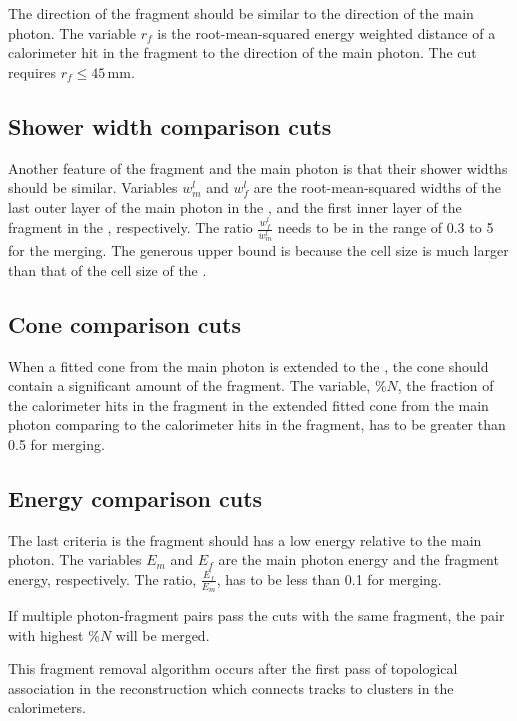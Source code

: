 The direction of the fragment should be similar to the direction of the main photon. The variable  $r_f$ is the root-mean-squared energy weighted distance of a calorimeter hit in the fragment to the direction of the main photon.  The cut requires $ r_f \leqslant 45\,\text{mm}$.

\subsection{Shower width comparison cuts}

Another feature of the fragment and the main photon is that their shower widths should be similar. Variables $w^l_m$ and $w^l_f$ are the root-mean-squared widths of the last outer layer of the main photon in the \ECAL, and the first inner layer of the fragment in the \HCAL, respectively. The ratio $\frac{w^l_f}{w^l_m}$ needs to be in the range of 0.3 to 5 for the merging. The generous upper bound is because the \HCAL cell size is much larger than that of the cell size of the \ECAL.

\subsection{Cone comparison cuts}

When a fitted cone from the main photon is extended to the \HCAL, the cone should contain a significant amount of the fragment. The variable, $\%{N}$, the fraction of the calorimeter hits in the fragment in the extended fitted cone from the main photon comparing to the  calorimeter hits in the fragment, has to be greater than 0.5 for merging.

\subsection{Energy comparison cuts}


The last criteria is the fragment should has a low energy relative to the main photon. The variables $E_m$ and $E_f$ are the main photon energy and the fragment energy, respectively. The ratio, $\frac{E_f}{E_m}$, has to be less than 0.1 for merging.


If multiple photon-fragment pairs pass the cuts with the same fragment, the pair with highest $\%{N}$ will be merged.

This \HCAL fragment removal algorithm occurs after the first pass of topological association in the reconstruction which connects tracks to clusters in the calorimeters.



